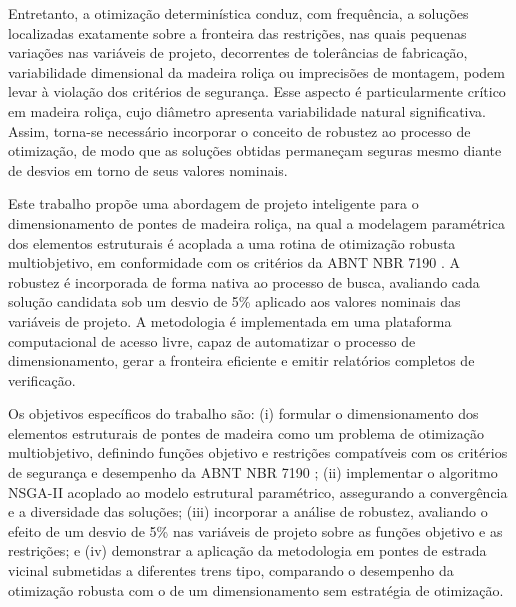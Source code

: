 Entretanto, a otimização determinística conduz, com frequência, a soluções localizadas exatamente sobre a fronteira das restrições, nas quais pequenas variações nas variáveis de projeto, decorrentes de tolerâncias de fabricação, variabilidade dimensional da madeira roliça ou imprecisões de montagem, podem levar à violação dos critérios de segurança. Esse aspecto é particularmente crítico em madeira roliça, cujo diâmetro apresenta variabilidade natural significativa. Assim, torna-se necessário incorporar o conceito de robustez ao processo de otimização, de modo que as soluções obtidas permaneçam seguras mesmo diante de desvios em torno de seus valores nominais.

Este trabalho propõe uma abordagem de projeto inteligente para o dimensionamento de pontes de madeira roliça, na qual a modelagem paramétrica dos elementos estruturais é acoplada a uma rotina de otimização robusta multiobjetivo, em conformidade com os critérios da ABNT NBR 7190 \parencite{NBR7190-1:2022}. A robustez é incorporada de forma nativa ao processo de busca, avaliando cada solução candidata sob um desvio de 5\% aplicado aos valores nominais das variáveis de projeto. A metodologia é implementada em uma plataforma computacional de acesso livre, capaz de automatizar o processo de dimensionamento, gerar a fronteira eficiente e emitir relatórios completos de verificação.

Os objetivos específicos do trabalho são: (i) formular o dimensionamento dos elementos estruturais de pontes de madeira como um problema de otimização multiobjetivo, definindo funções objetivo e restrições compatíveis com os critérios de segurança e desempenho da ABNT NBR 7190 \parencite{NBR7190-1:2022}; (ii) implementar o algoritmo NSGA-II acoplado ao modelo estrutural paramétrico, assegurando a convergência e a diversidade das soluções; (iii) incorporar a análise de robustez, avaliando o efeito de um desvio de 5\% nas variáveis de projeto sobre as funções objetivo e as restrições; e (iv) demonstrar a aplicação da metodologia em pontes de estrada vicinal submetidas a diferentes trens tipo, comparando o desempenho da otimização robusta com o de um dimensionamento sem estratégia de otimização.
